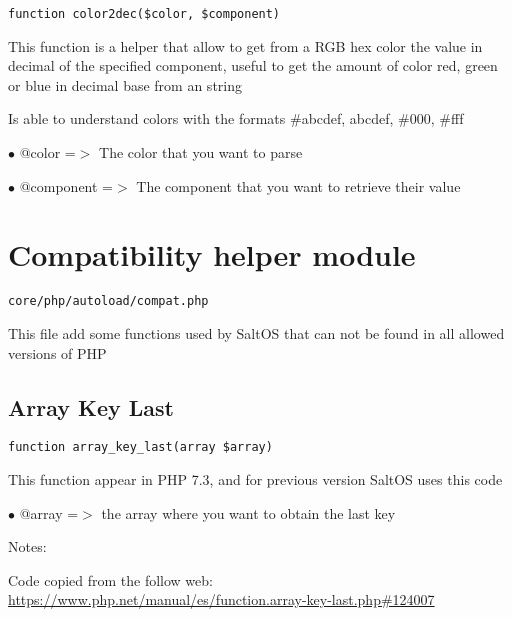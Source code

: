 \documentclass[a4paper]{book}
\def\htmladdnormallink#1#2{\href{#2}{#1}}
\begin{document}
\begin{lstlisting}
function color2dec($color, $component)
\end{lstlisting}

This function is a helper that allow to get from a RGB hex color the value
in decimal of the specified component, useful to get the amount of color
red, green or blue in decimal base from an string

Is able to understand colors with the formats \#abcdef, abcdef, \#000, \#fff

\begin{compactitem}
\item[\color{myblue}$\bullet$] @color     =$>$ The color that you want to parse
\item[\color{myblue}$\bullet$] @component =$>$ The component that you want to retrieve their value
\end{compactitem}

\hypertarget{toc47}{}
\section{Compatibility helper module}

\begin{lstlisting}
core/php/autoload/compat.php
\end{lstlisting}

This file add some functions used by SaltOS that can not be found in all allowed versions of PHP

\hypertarget{toc48}{}
\subsection{Array Key Last}

\begin{lstlisting}
function array_key_last(array $array)
\end{lstlisting}

This function appear in PHP 7.3, and for previous version SaltOS
uses this code

\begin{compactitem}
\item[\color{myblue}$\bullet$] @array =$>$ the array where you want to obtain the last key
\end{compactitem}

Notes:

Code copied from the follow web:
\htmladdnormallink{https://www.php.net/manual/es/function.array-key-last.php\#124007}{https://www.php.net/manual/es/function.array-key-last.php\#124007}
\end{document}
